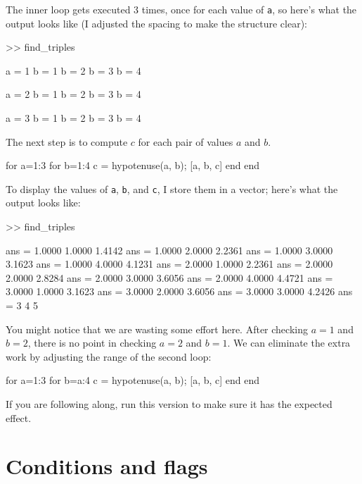 \documentclass[
]{book}
\numberwithin{Answer}{chapter}
\numberwithin{Exercise}{chapter}
\begin{document}
The inner loop gets executed 3 times, once for each value of {\tt a},
so here's what the output looks like (I adjusted the spacing to make
the structure clear):

\begin{code}
>> find_triples

a = 1   b = 1
        b = 2
        b = 3
        b = 4

a = 2   b = 1
        b = 2
        b = 3
        b = 4

a = 3   b = 1
        b = 2
        b = 3
        b = 4
\end{code}

The next step is to compute $c$ for each pair of values $a$ and $b$.

\begin{code}
for a=1:3
    for b=1:4
        c = hypotenuse(a, b);
        [a, b, c]
    end
end
\end{code}

To display the values of {\tt a}, {\tt b}, and {\tt c}, I store them in a vector; here's what the output looks like:

\begin{code}
>> find_triples

ans = 1.0000    1.0000    1.4142
ans = 1.0000    2.0000    2.2361
ans = 1.0000    3.0000    3.1623
ans = 1.0000    4.0000    4.1231
ans = 2.0000    1.0000    2.2361
ans = 2.0000    2.0000    2.8284
ans = 2.0000    3.0000    3.6056
ans = 2.0000    4.0000    4.4721
ans = 3.0000    1.0000    3.1623
ans = 3.0000    2.0000    3.6056
ans = 3.0000    3.0000    4.2426
ans = 3         4         5
\end{code}

You might notice that we are wasting some effort here.
After checking $a=1$ and $b=2$, there is no point in checking
$a=2$ and $b=1$.  We can eliminate the extra work by adjusting the
range of the second loop:

\begin{code}
for a=1:3
    for b=a:4
        c = hypotenuse(a, b);
        [a, b, c]
    end
end
\end{code}

If you are following along, run this version to make sure it has
the expected effect.


\section{Conditions and flags}

\end{document}
